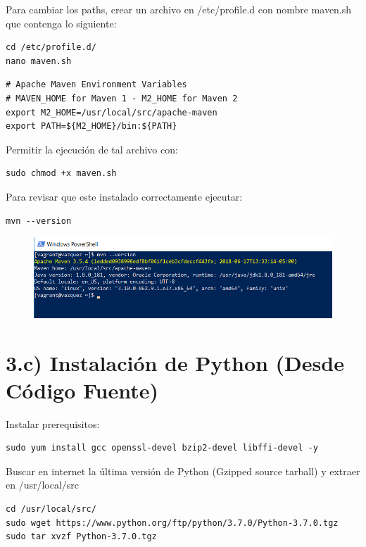\documentclass[]{article}
\begin{document}
Para cambiar los paths, crear un archivo en /etc/profile.d con nombre
maven.sh que contenga lo siguiente:

\begin{verbatim}
cd /etc/profile.d/
nano maven.sh
\end{verbatim}

\begin{verbatim}
# Apache Maven Environment Variables  
# MAVEN_HOME for Maven 1 - M2_HOME for Maven 2  
export M2_HOME=/usr/local/src/apache-maven
export PATH=${M2_HOME}/bin:${PATH}
\end{verbatim}

Permitir la ejecución de tal archivo con:

\begin{verbatim}
sudo chmod +x maven.sh
\end{verbatim}

Para revisar que este instalado correctamente ejecutar:

\begin{verbatim}
mvn --version
\end{verbatim}

\begin{figure}[htbp]
\centering
\includegraphics{maven.png}
\end{figure}

\section{3.c) Instalación de Python (Desde Código
Fuente)}\label{c-instalacion-de-python-desde-codigo-fuente}

Instalar prerequisitos:

\begin{verbatim}
sudo yum install gcc openssl-devel bzip2-devel libffi-devel -y
\end{verbatim}

Buscar en internet la última versión de Python (Gzipped source tarball)
y extraer en /usr/local/src

\begin{verbatim}
cd /usr/local/src/
sudo wget https://www.python.org/ftp/python/3.7.0/Python-3.7.0.tgz
sudo tar xvzf Python-3.7.0.tgz
\end{verbatim}
\end{document}
